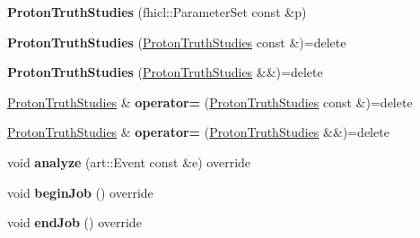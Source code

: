\begin{DoxyCompactItemize}
\item 
{\bfseries Proton\+Truth\+Studies} (fhicl\+::\+Parameter\+Set const \&p)\hypertarget{classProtonTruthStudies_acb45ae09f4c73fe459dd3961f53da487}{}\label{classProtonTruthStudies_acb45ae09f4c73fe459dd3961f53da487}

\item 
{\bfseries Proton\+Truth\+Studies} (\hyperlink{classProtonTruthStudies}{Proton\+Truth\+Studies} const \&)=delete\hypertarget{classProtonTruthStudies_a8a3b737c0a0ede99cb18b5449007193e}{}\label{classProtonTruthStudies_a8a3b737c0a0ede99cb18b5449007193e}

\item 
{\bfseries Proton\+Truth\+Studies} (\hyperlink{classProtonTruthStudies}{Proton\+Truth\+Studies} \&\&)=delete\hypertarget{classProtonTruthStudies_a0d886dadf4fb03121a02971d70c797d0}{}\label{classProtonTruthStudies_a0d886dadf4fb03121a02971d70c797d0}

\item 
\hyperlink{classProtonTruthStudies}{Proton\+Truth\+Studies} \& {\bfseries operator=} (\hyperlink{classProtonTruthStudies}{Proton\+Truth\+Studies} const \&)=delete\hypertarget{classProtonTruthStudies_ac5238bf49bd186c572e8a34aa9a38f9f}{}\label{classProtonTruthStudies_ac5238bf49bd186c572e8a34aa9a38f9f}

\item 
\hyperlink{classProtonTruthStudies}{Proton\+Truth\+Studies} \& {\bfseries operator=} (\hyperlink{classProtonTruthStudies}{Proton\+Truth\+Studies} \&\&)=delete\hypertarget{classProtonTruthStudies_a01b347b069e00517ac8ee9e4b9a207ea}{}\label{classProtonTruthStudies_a01b347b069e00517ac8ee9e4b9a207ea}

\item 
void {\bfseries analyze} (art\+::\+Event const \&e) override\hypertarget{classProtonTruthStudies_a3eb819554253429f62473a4690bec53d}{}\label{classProtonTruthStudies_a3eb819554253429f62473a4690bec53d}

\item 
void {\bfseries begin\+Job} () override\hypertarget{classProtonTruthStudies_a80d8c2e71f8c307cbf1dcd7aad211e8a}{}\label{classProtonTruthStudies_a80d8c2e71f8c307cbf1dcd7aad211e8a}

\item 
void {\bfseries end\+Job} () override\hypertarget{classProtonTruthStudies_a337810836a8d96a20669857d85f36e35}{}\label{classProtonTruthStudies_a337810836a8d96a20669857d85f36e35}

\end{DoxyCompactItemize}
